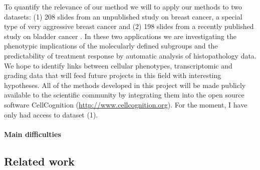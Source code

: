\documentclass[a4paper,10pt]{article}
\begin{document}
To
quantify the relevance of our method we will to apply  our methods to
two datasets: (1) 208 slides from an unpublished study on breast
cancer, a special type of very aggressive breast cancer  and (2) 198
slides from a recently published study on bladder cancer
\citep{biton2014independent}. In these two applications we are
investigating the phenotypic implications of the molecularly defined
subgroups and the predictability of treatment response by automatic
analysis of histopathology data.  We hope to identify links between
cellular phenotypes, transcriptomic and grading data that will feed
future projects in this field with interesting hypotheses. All of the
methods developed in this project will be made publicly available to
the scientific community by integrating them into the open source
software CellCognition (\url{http://www.cellcognition.org}). For the
moment, I have only had access to dataset (1). 

\paragraph{Main difficulties}

\subsection{Related work}
\end{document}
